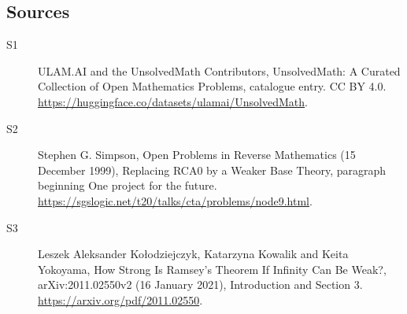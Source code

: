 \documentclass[11pt]{article}
\begin{document}
\subsection{Sources}
\begin{description}
\item[\hypertarget{source:statement:1}{S1}] ULAM.AI and the UnsolvedMath Contributors, UnsolvedMath: A Curated Collection of Open Mathematics Problems, catalogue entry. CC BY 4.0. \url{https://huggingface.co/datasets/ulamai/UnsolvedMath}.
\item[\hypertarget{source:statement:2}{S2}] Stephen G. Simpson, Open Problems in Reverse Mathematics (15 December 1999), Replacing RCA0 by a Weaker Base Theory, paragraph beginning One project for the future. \url{https://sgslogic.net/t20/talks/cta/problems/node9.html}.
\item[\hypertarget{source:statement:3}{S3}] Leszek Aleksander Ko\l odziejczyk, Katarzyna Kowalik and Keita Yokoyama, How Strong Is Ramsey's Theorem If Infinity Can Be Weak?, arXiv:2011.02550v2 (16 January 2021), Introduction and Section 3. \url{https://arxiv.org/pdf/2011.02550}.
\end{description}
\label{end:statement}
\end{document}

